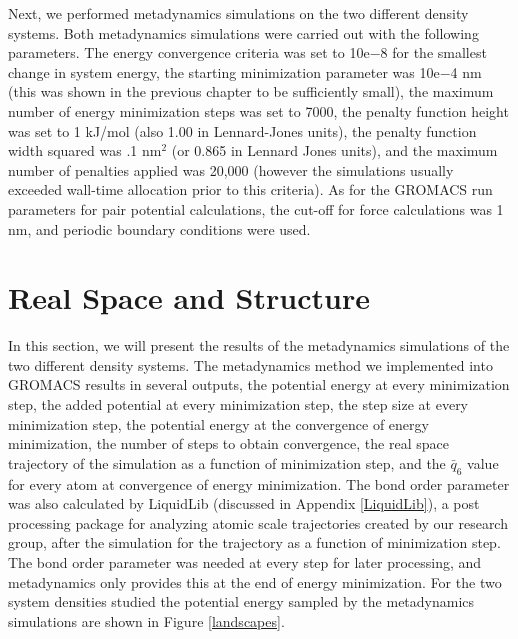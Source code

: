 Next, we performed metadynamics simulations on the two different density systems.  Both metadynamics simulations were carried out with the following parameters.  The energy convergence criteria was set to 10e$-$8 for the smallest change in system energy, the starting minimization parameter was 10e$-$4 nm (this was shown in the previous chapter to be sufficiently small), the maximum number of energy minimization steps was set to 7000, the penalty function height was set to 1 kJ/mol (also 1.00 in Lennard-Jones units), the penalty function width squared was .1 nm$^2$ (or 0.865 in Lennard Jones units), and the maximum number of penalties applied was 20,000 (however the simulations usually exceeded wall-time allocation prior to this criteria).  As for the GROMACS run parameters for pair potential calculations, the cut-off for force calculations was 1 nm, and periodic boundary conditions were used.  

\section{Real Space and Structure}
In this section, we will present the results of the metadynamics simulations of the two different density systems.  The metadynamics method we implemented into GROMACS results in several outputs, the potential energy at every minimization step, the added potential at every minimization step, the step size at every minimization step, the potential energy at the convergence of energy minimization, the number of steps to obtain convergence, the real space trajectory of the simulation as a function of minimization step, and the $\bar{q}_6$ value for every atom at convergence of energy minimization.  The bond order parameter was also calculated by LiquidLib (discussed in Appendix \ref{LiquidLib}), a post processing package for analyzing atomic scale trajectories created by our research group, after the simulation for the trajectory as a function of minimization step.  The bond order parameter was needed at every step for later processing, and metadynamics only provides this at the end of energy minimization.  For the two system densities studied the potential energy sampled by the metadynamics simulations are shown in Figure \ref{landscapes}.

